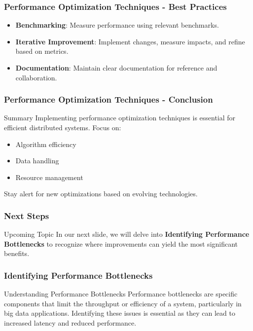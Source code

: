 \documentclass[aspectratio=169]{beamer}
\begin{document}
\begin{frame}[fragile]
    \frametitle{Performance Optimization Techniques - Best Practices}
    \begin{itemize}
        \item \textbf{Benchmarking}: Measure performance using relevant benchmarks.
        \item \textbf{Iterative Improvement}: Implement changes, measure impacts, and refine based on metrics.
        \item \textbf{Documentation}: Maintain clear documentation for reference and collaboration.
    \end{itemize}
\end{frame}

\begin{frame}[fragile]
    \frametitle{Performance Optimization Techniques - Conclusion}
    \begin{block}{Summary}
        Implementing performance optimization techniques is essential for efficient distributed systems. Focus on:
        \begin{itemize}
            \item Algorithm efficiency
            \item Data handling
            \item Resource management
        \end{itemize}
        Stay alert for new optimizations based on evolving technologies.
    \end{block}
\end{frame}

\begin{frame}[fragile]
    \frametitle{Next Steps}
    \begin{block}{Upcoming Topic}
        In our next slide, we will delve into \textbf{Identifying Performance Bottlenecks} to recognize where improvements can yield the most significant benefits.
    \end{block}
\end{frame}

\begin{frame}[fragile]
    \frametitle{Identifying Performance Bottlenecks}
    \begin{block}{Understanding Performance Bottlenecks}
        Performance bottlenecks are specific components that limit the throughput or efficiency of a system, particularly in big data applications. Identifying these issues is essential as they can lead to increased latency and reduced performance.
    \end{block}
\end{frame}
\end{document}

